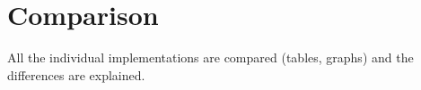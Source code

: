 \documentclass[final]{report}
\begin{document}
\chapter{Comparison}
All the individual implementations are compared (tables, graphs) and the differences are explained.
\end{document}
